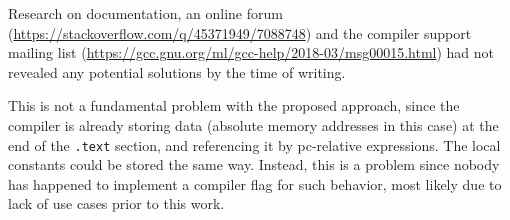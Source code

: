 Research on documentation, an online forum (\url{https://stackoverflow.com/q/45371949/7088748}) and the compiler support mailing list (\url{https://gcc.gnu.org/ml/gcc-help/2018-03/msg00015.html}) had not revealed any potential solutions by the time of writing.

This is not a fundamental problem with the proposed approach, since the compiler is already storing data (absolute memory addresses in this case) at the end of the \texttt{.text} section, and referencing it by \gls{pc}-relative expressions. The local constants could be stored the same way. Instead, this is a problem since nobody has happened to implement a compiler flag for such behavior, most likely due to lack of use cases prior to this work.
